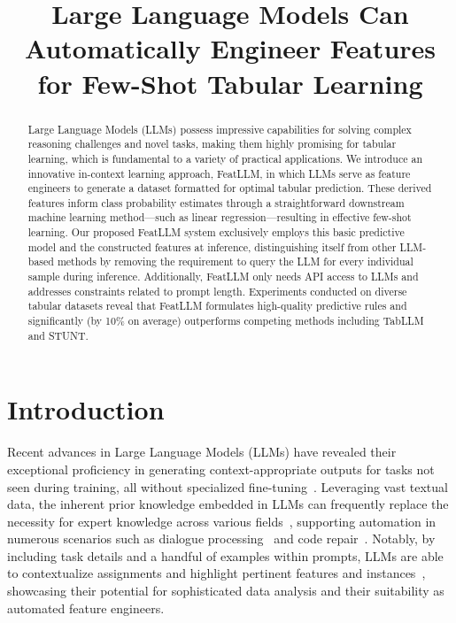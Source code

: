 \title{Large Language Models Can Automatically Engineer Features for Few-Shot Tabular Learning}

\begin{abstract}
Large Language Models (LLMs) possess impressive capabilities for solving complex reasoning challenges and novel tasks, making them highly promising for tabular learning, which is fundamental to a variety of practical applications. We introduce an innovative in-context learning approach, \textsf{FeatLLM}, in which LLMs serve as feature engineers to generate a dataset formatted for optimal tabular prediction. These derived features inform class probability estimates through a straightforward downstream machine learning method—such as linear regression—resulting in effective few-shot learning. Our proposed \textsf{FeatLLM} system exclusively employs this basic predictive model and the constructed features at inference, distinguishing itself from other LLM-based methods by removing the requirement to query the LLM for every individual sample during inference. Additionally, \textsf{FeatLLM} only needs API access to LLMs and addresses constraints related to prompt length. Experiments conducted on diverse tabular datasets reveal that \textsf{FeatLLM} formulates high-quality predictive rules and significantly (by 10\% on average) outperforms competing methods including TabLLM and STUNT.
\end{abstract}

\section{Introduction}
Recent advances in Large Language Models (LLMs) have revealed their exceptional proficiency in generating context-appropriate outputs for tasks not seen during training, all without specialized fine-tuning~\cite{creswell2022selection,imani2023mathprompter,taylor2022galactica}. Leveraging vast textual data, the inherent prior knowledge embedded in LLMs can frequently replace the necessity for expert knowledge across various fields~\cite{Genomes2021,singhal2023large,wilcox2003role}, supporting automation in numerous scenarios such as dialogue processing~\cite{finch2023leveraging} and code repair~\cite{fan2023automated}. Notably, by including task details and a handful of examples within prompts, LLMs are able to contextualize assignments and highlight pertinent features and instances~\cite{brown2020language,zhao2023survey}, showcasing their potential for sophisticated data analysis and their suitability as automated feature engineers.

